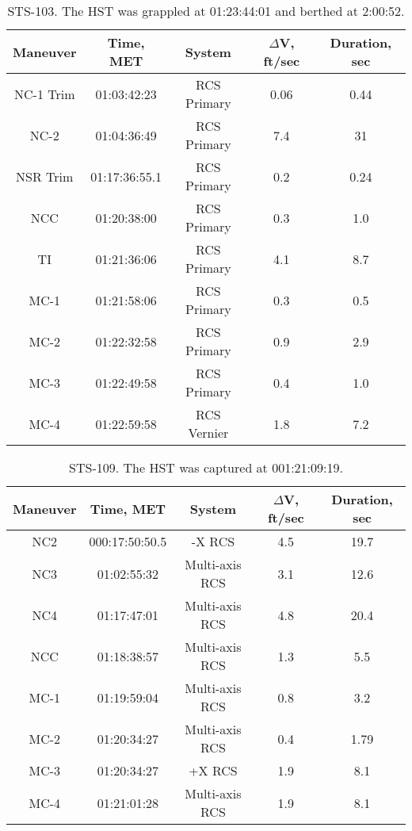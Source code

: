 \documentclass[onecolumn,10pt]{jhwhw}
\begin{document}
\begin{table}[t!]
\begin{center}
\begin{tabular}{|c |c |c |c |c|}
\hline
Maneuver & Time, MET & System & $\Delta$V, ft/sec & Duration, sec \\
\hline
NC-1 Trim & 01:03:42:23    & RCS Primary & 0.06 & 0.44   \\ \hline
NC-2      & 01:04:36:49    & RCS Primary & 7.4  & 31     \\ \hline
NSR Trim  & 01:17:36:55.1  & RCS Primary & 0.2  & 0.24   \\ \hline
NCC       & 01:20:38:00    & RCS Primary & 0.3  & 1.0    \\ \hline
TI        & 01:21:36:06    & RCS Primary & 4.1  & 8.7    \\ \hline
MC-1      & 01:21:58:06    & RCS Primary & 0.3  & 0.5    \\ \hline
MC-2      & 01:22:32:58    & RCS Primary & 0.9  & 2.9    \\ \hline
MC-3      & 01:22:49:58    & RCS Primary & 0.4  & 1.0    \\ \hline
MC-4      & 01:22:59:58    & RCS Vernier & 1.8  & 7.2    \\ \hline
\end{tabular}
\end{center}
\caption{STS-103. The HST was grappled at 01:23:44:01 and berthed at 2:00:52.}
\end{table}


\begin{table}[t!]
\begin{center}
\begin{tabular}{|c |c |c |c |c|}
\hline
Maneuver & Time, MET & System & $\Delta$V, ft/sec & Duration, sec \\
\hline
NC2  & 000:17:50:50.5 & -X RCS & 4.5 & 19.7 \\ \hline
NC3  & 01:02:55:32    & Multi-axis RCS & 3.1 & 12.6 \\ \hline
NC4  & 01:17:47:01    & Multi-axis RCS & 4.8 & 20.4 \\ \hline
NCC  & 01:18:38:57    & Multi-axis RCS & 1.3 & 5.5 \\ \hline
MC-1 & 01:19:59:04    & Multi-axis RCS & 0.8 & 3.2 \\ \hline
MC-2 & 01:20:34:27    & Multi-axis RCS & 0.4 & 1.79 \\ \hline
MC-3 & 01:20:34:27    & +X RCS & 1.9 & 8.1 \\ \hline
MC-4 & 01:21:01:28    & Multi-axis RCS & 1.9 & 8.1 \\ \hline
\end{tabular}
\end{center}
\caption{STS-109. The HST was captured at 001:21:09:19.}
\end{table}
\end{document}

